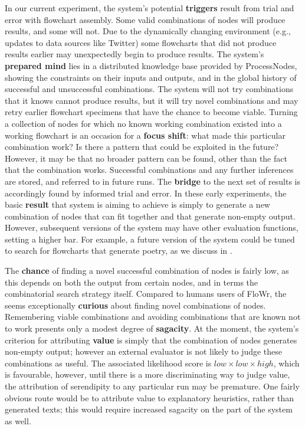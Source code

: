 In our current experiment, the system's potential \textbf{triggers}
result from trial and error with flowchart assembly.  Some valid
combinations of nodes will produce results, and some will not.  Due to
the dynamically changing environment (e.g., updates to data sources
like Twitter) some flowcharts that did not produce results earlier may
unexpectedly begin to produce results.
%
The system's \textbf{prepared mind} lies in a distributed knowledge
base provided by ProcessNodes, showing the constraints on their inputs
and outputs, and in the global history of successful and unsuccessful
combinations.
%
The system will not try combinations that it knows cannot produce
results, but it will try novel combinations and may retry earlier
flowchart specimens that have the chance to become viable.  Turning a
collection of nodes for which no known working combination existed
into a working flowchart is an occasion for a \textbf{focus shift}:
what made this particular combination work?  Is there a pattern that
could be exploited in the future?  However, it may be that no
broader pattern can be found, other than the fact that the combination works.
%
Successful combinations and any further inferences are stored, and
referred to in future runs.  The \textbf{bridge} to the next set of
results is accordingly found by informed trial and error.
%
In these early experiments, the basic \textbf{result} that system is
aiming to achieve is simply to generate a new combination of nodes that can fit together and that generate non-empty output.  However, subsequent versions of the system may have other evaluation functions, setting a higher bar.  For example, a future version of the system could be tuned to search for flowcharts that generate poetry, as we discuss in \cite{corneli2015computational}.

The \textbf{chance} of finding a novel successful combination of nodes
is fairly low, as this depends on both the output from certain nodes,
and in terms the combinatorial search strategy itself.  Compared to
humans users of {\sf FloWr}, the seems exceptionally \textbf{curious}
about finding novel combinations of nodes.  Remembering viable
combinations and avoiding combinations that are known not to work
presents only a modest degree of \textbf{sagacity}.  At the moment,
the system's criterion for attributing \textbf{value} is simply that
the combination of nodes generates non-empty output; however an
external evaluator is not likely to judge these combinations as
useful.  The associated likelihood score is
$\mathit{low}\times\mathit{low}\times\mathit{high}$, which
is favourable, however, until there is a
more discriminating way to judge value, the
attribution of serendipity to any particular run may
be premature.  One fairly obvious route would be to attribute
value to explanatory heuristics, rather than generated texts;
this would require increased sagacity on the part of the
system as well.

